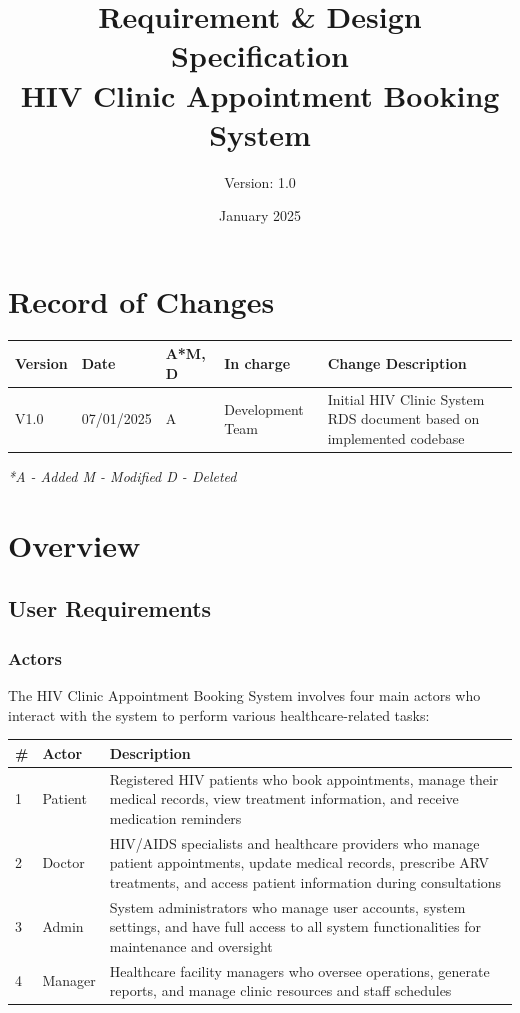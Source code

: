 \documentclass[12pt,a4paper]{article}
\title{\textbf{Requirement \& Design Specification\\HIV Clinic Appointment Booking System}}
\author{Version: 1.0}
\date{January 2025}
\begin{document}
\maketitle
\thispagestyle{empty}

\newpage

\section*{Record of Changes}

\begin{longtable}{|p{2cm}|p{2cm}|p{1cm}|p{3cm}|p{6cm}|}
\hline
\textbf{Version} & \textbf{Date} & \textbf{A*M, D} & \textbf{In charge} & \textbf{Change Description} \\
\hline
V1.0 & 07/01/2025 & A & Development Team & Initial HIV Clinic System RDS document based on implemented codebase \\
\hline
\end{longtable}

\textit{*A - Added M - Modified D - Deleted}

\newpage

\tableofcontents

\newpage

\section{Overview}

\subsection{User Requirements}

\subsubsection{Actors}

The HIV Clinic Appointment Booking System involves four main actors who interact with the system to perform various healthcare-related tasks:

\begin{longtable}{|p{1cm}|p{3cm}|p{10cm}|}
\hline
\textbf{\#} & \textbf{Actor} & \textbf{Description} \\
\hline
1 & Patient & Registered HIV patients who book appointments, manage their medical records, view treatment information, and receive medication reminders \\
\hline
2 & Doctor & HIV/AIDS specialists and healthcare providers who manage patient appointments, update medical records, prescribe ARV treatments, and access patient information during consultations \\
\hline
3 & Admin & System administrators who manage user accounts, system settings, and have full access to all system functionalities for maintenance and oversight \\
\hline
4 & Manager & Healthcare facility managers who oversee operations, generate reports, and manage clinic resources and staff schedules \\
\hline
\end{longtable}
\end{document}
